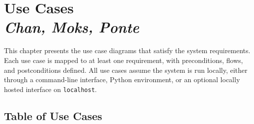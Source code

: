 \chapter{Use Cases \\
\small{\textit{Chan, Moks, Ponte}}
\label{Chapter::UseCases}}

This chapter presents the use case diagrams that satisfy the system requirements. Each use case is mapped to at least one requirement, with preconditions, flows, and postconditions defined. All use cases assume the system is run locally, either through a command-line interface, Python environment, or an optional locally hosted interface on \texttt{localhost}.


\section{Table of Use Cases}
\small
